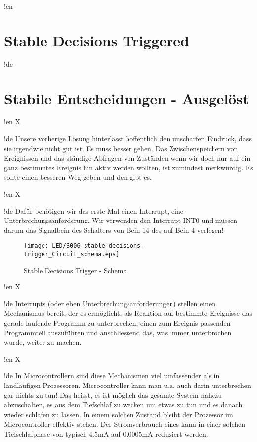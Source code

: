 !en \section{Stable Decisions Triggered}
!de \section{Stabile Entscheidungen - Ausgelöst}

!en X

!de Unsere vorherige Lösung hinterlässt hoffentlich den unscharfen Eindruck, dass sie irgendwie nicht gut ist. Es muss besser gehen. Das Zwischenspeichern von Ereignissen und das ständige Abfragen von Zuständen wenn wir doch nur auf ein ganz bestimmtes Ereignis hin aktiv werden wollten, ist zumindest merkwürdig. Es sollte einen besseren Weg geben und den gibt es.



!en X

!de Dafür benötigen wir das erste Mal einen Interrupt, eine Unterbrechungsanforderung. Wir verwenden den Interrupt INT0 und müssen darum das Signalbein des Schalters von Bein 14 des \at{} auf Bein 4 verlegen!


\begin{figure}[htbp]
  \centering
  \texttt{[image: LED/S006\_stable-decisions-trigger\_Circuit\_schema.eps]}
  \caption{Stable Decisions Trigger - Schema}
  \label{atmega8-stable-decisions-trigger-schema}
\end{figure}


!en X

!de Interrupts (oder eben Unterbrechungsanforderungen) stellen einen Mechanismus bereit, der es ermöglicht, als Reaktion auf bestimmte Ereignisse das gerade laufende Programm zu unterbrechen, einen zum Ereignis passenden Programmteil auszuführen und anschliessend das, was immer unterbrochen wurde, weiter zu machen.



!en X

!de In Microcontrollern sind diese Mechanismen viel umfassender als in landläufigen Prozessoren. Microcontroller kann man u.a. auch darin unterbrechen gar nichts zu tun! Das heisst, es ist möglich das gesamte System nahezu abzuschalten, es aus dem Tiefschlaf zu wecken um etwas zu tun und es danach wieder schlafen zu lassen. In einem solchen Zustand bleibt der Prozessor im Microcontroller effektiv stehen. Der Stromverbrauch eines \at{} kann in einer solchen Tiefschlafphase von typisch 4.5mA auf 0.0005mA reduziert werden.



